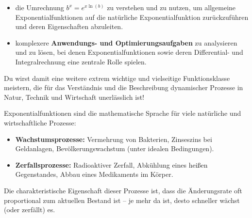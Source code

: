 \begin{tcolorbox}[colback=blue!5!white, colframe=blue!75!black, title=Was du in diesem Kapitel lernen wirst:]
\begin{itemize}[noitemsep, topsep=0pt, leftmargin=*, itemsep=2pt]
    \item die Umrechnung $b^x = e^{x \ln(b)}$ zu verstehen und zu nutzen, um allgemeine Exponentialfunktionen auf die natürliche Exponentialfunktion zurückzuführen und deren Eigenschaften abzuleiten.
    \item komplexere \textbf{Anwendungs- und Optimierungsaufgaben} zu analysieren und zu lösen, bei denen Exponentialfunktionen sowie deren Differential- und Integralrechnung eine zentrale Rolle spielen.
\end{itemize}
Du wirst damit eine weitere extrem wichtige und vielseitige Funktionsklasse meistern, die für das Verständnis und die Beschreibung dynamischer Prozesse in Natur, Technik und Wirtschaft unerlässlich ist!
\end{tcolorbox}
\bigskip

Exponentialfunktionen sind die mathematische Sprache für viele natürliche und wirtschaftliche Prozesse:
\begin{itemize}
    \item \textbf{Wachstumsprozesse:} Vermehrung von Bakterien, Zinseszins bei Geldanlagen, Bevölkerungswachstum (unter idealen Bedingungen).
    \item \textbf{Zerfallsprozesse:} Radioaktiver Zerfall, Abkühlung eines heißen Gegenstandes, Abbau eines Medikaments im Körper.
\end{itemize}
Die charakteristische Eigenschaft dieser Prozesse ist, dass die Änderungsrate oft proportional zum aktuellen Bestand ist – je mehr da ist, desto schneller wächst (oder zerfällt) es.

